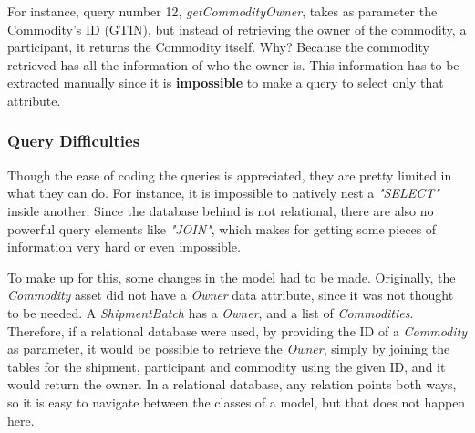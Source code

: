For instance, query number 12, \textit{getCommodityOwner}, takes as parameter the Commodity's ID (GTIN), but instead of retrieving the owner of the commodity, a participant, it returns the Commodity itself. Why? Because the commodity retrieved has all the information of who the owner is. This information has to be extracted manually since it is \textbf{impossible} to make a query to select only that attribute.

\subsubsection*{Query Difficulties}

Though the ease of coding the queries is appreciated, they are pretty limited in what they can do. For instance, it is impossible to natively nest a \textit{"SELECT"} inside another. Since the database behind is not relational, there are also no powerful query elements like \textit{"JOIN"}, which makes for getting some pieces of information very hard or even impossible. 

To make up for this, some changes in the model had to be made. Originally, the \textit{Commodity} asset did not have a \textit{Owner} data attribute, since it was not thought to be needed. A \textit{ShipmentBatch} has a \textit{Owner}, and a list of \textit{Commodities}. Therefore, if a relational database were used, by providing the ID of a \textit{Commodity} as parameter, it would be possible to retrieve the \textit{Owner}, simply by joining the tables for the shipment, participant and commodity using the given ID, and it would return the owner. In a relational database, any relation points both ways, so it is easy to navigate between the classes of a model, but that does not happen here.



